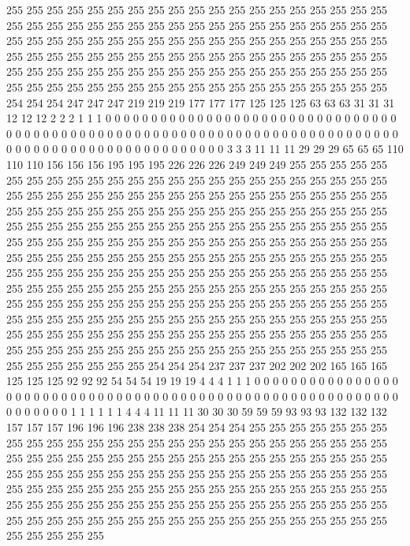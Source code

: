 255 255 255 255 255 255 255 255 255 255 255 255 255 255 255 255 255 255 255 255 255 255 255 255 255 255 255 255 255 255 255 255 255 255 255 255 255 255 255 255 255 255 255 255 255 255 255 255 255 255 255 255 255 255 255 255 255 255 255 255 255 255 255 255 255 255 255 255 255 255 255 255 255 255 255 255 255 255 255 255 255 255 255 255 255 255 255 255 255 255 255 255 255 255 255 255 255 255 255 255 255 255 255 255 255 255 255 255 255 255 255 255 255 255 254 254 254 247 247 247 219 219 219 177 177 177 125 125 
125 63 63 63 31 31 31 12 12 12 2 2 2 1 1 1 0 0 0 0 0 0 0 0 0 0 0 0 0 0 0 0 0 0 0 0 0 0 0 0 0 0 0 0 0 0 0 0 0 0 0 0 0 0 0 0 0 0 0 0 0 0 0 0 0 0 0 0 0 0 0 0 0 0 0 0 0 0 0 0 0 0 0 0 0 0 0 0 0 0 0 0 0 0 0 0 0 0 0 0 0 0 0 0 0 0 0 0 0 0 0 0 0 0 0 3 3 3 11 11 11 29 29 29 65 65 65 110 
110 110 156 156 156 195 195 195 226 226 226 249 249 249 255 255 255 255 255 255 255 255 255 255 255 255 255 255 255 255 255 255 255 255 255 255 255 255 255 255 255 255 255 255 255 255 255 255 255 255 255 255 255 255 255 255 255 255 255 255 255 255 255 255 255 255 255 255 255 255 255 255 255 255 255 255 255 255 255 255 255 255 255 255 255 255 255 255 255 255 255 255 255 255 255 255 255 255 255 255 255 255 255 255 255 255 255 255 255 255 255 255 255 255 255 255 255 255 255 255 255 255 255 255 255 255 255 255 
255 255 255 255 255 255 255 255 255 255 255 255 255 255 255 255 255 255 255 255 255 255 255 255 255 255 255 255 255 255 255 255 255 255 255 255 255 255 255 255 255 255 255 255 255 255 255 255 255 255 255 255 255 255 255 255 255 255 255 255 255 255 255 255 255 255 255 255 255 255 255 255 255 255 255 255 255 255 255 255 255 255 255 255 255 255 255 255 255 255 255 255 255 255 255 255 255 255 255 255 255 255 255 255 255 255 255 255 255 255 255 255 255 255 255 255 255 255 255 255 255 255 255 255 255 255 254 254 
254 237 237 237 202 202 202 165 165 165 125 125 125 92 92 92 54 54 54 19 19 19 4 4 4 1 1 1 0 0 0 0 0 0 0 0 0 0 0 0 0 0 0 0 0 0 0 0 0 0 0 0 0 0 0 0 0 0 0 0 0 0 0 0 0 0 0 0 0 0 0 0 0 0 0 0 0 0 0 0 0 0 0 0 0 0 0 0 0 0 0 0 0 0 1 1 1 1 1 1 4 4 4 11 11 11 30 30 30 59 59 59 93 93 93 132 132 132 157 157 157 196 196 196 238 238 238 254 
254 254 255 255 255 255 255 255 255 255 255 255 255 255 255 255 255 255 255 255 255 255 255 255 255 255 255 255 255 255 255 255 255 255 255 255 255 255 255 255 255 255 255 255 255 255 255 255 255 255 255 255 255 255 255 255 255 255 255 255 255 255 255 255 255 255 255 255 255 255 255 255 255 255 255 255 255 255 255 255 255 255 255 255 255 255 255 255 255 255 255 255 255 255 255 255 255 255 255 255 255 255 255 255 255 255 255 255 255 255 255 255 255 255 255 255 255 255 255 255 255 255 255 255 255 255 255 255 
